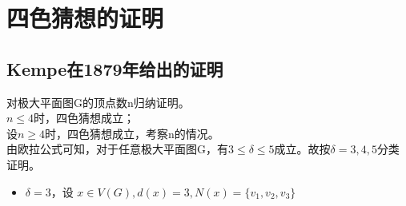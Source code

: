 \documentclass[12pt, UTF8]{ctexart}
\begin{document}
\section{四色猜想的证明}

\subsection{Kempe在1879年给出的证明}
对极大平面图G的顶点数n归纳证明。\\
$n \leq 4$时，四色猜想成立；\\
设$n \ge 4$时，四色猜想成立，考察n的情况。\\
由欧拉公式可知，对于任意极大平面图G，有$3 \leq \delta \leq 5$成立。故按$\delta = 3,4,5$分类证明。
\begin{itemize}
\item $\delta = 3$，设 $x \in V(G), d(x)=3, N(x)=\{v_1,v_2,v_3\}$
\end{itemize}
\end{document}
